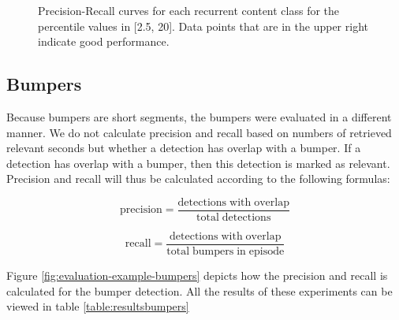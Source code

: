 \documentclass{article}
\begin{document}
\begin{figure}[h]
	\centering
	\caption{Precision-Recall curves for each recurrent content class for the percentile values in [2.5, 20]. Data points that are in the upper right indicate good performance.}
	\label{fig:precision-recall}
\end{figure}

\subsection{Bumpers}
Because bumpers are short segments, the bumpers were evaluated in a different manner. We do not calculate precision and recall based on numbers of retrieved relevant seconds but whether a detection has overlap with a bumper. If a detection has overlap with a bumper, then this detection is marked as relevant. Precision and recall will thus be calculated according to the following formulas:

\[\mathrm{precision} = \frac{\mathrm{detections\;with\;overlap}}{\mathrm{total\;detections}}\]

\[\mathrm{recall} = \frac{\mathrm{detections\;with\;overlap}}{\mathrm{total\;bumpers\;in\;episode}}\]

Figure \ref{fig:evaluation-example-bumpers} depicts how the precision and recall is calculated for the bumper detection. All the results of these experiments can be viewed in table \ref{table:resultsbumpers}
\end{document}
